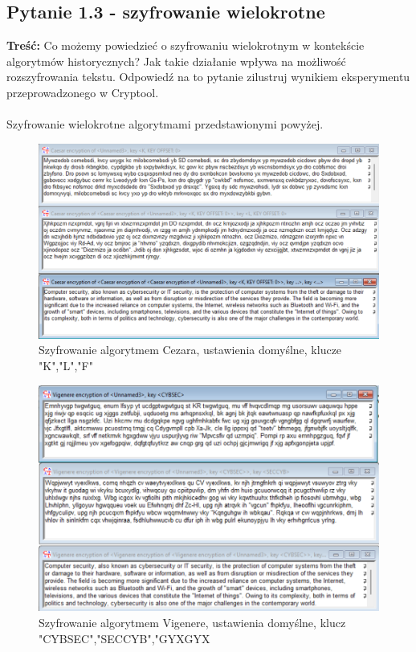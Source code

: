\documentclass{article}
\begin{document}
\subsection*{Pytanie 1.3 - szyfrowanie wielokrotne}
\textbf{Treść:}
Co możemy powiedzieć o szyfrowaniu wielokrotnym w kontekście algorytmów historycznych? Jak takie działanie wpływa na możliwość
rozszyfrowania tekstu. Odpowiedź na to pytanie zilustruj wynikiem eksperymentu przeprowadzonego w Cryptool.\\\\
Szyfrowanie wielokrotne algorytmami przedstawionymi powyżej.

\begin{figure}[H]
    \centering
    \includegraphics[width=\textwidth]{cezar_wielokrotne.png}
    \caption{Szyfrowanie algorytmem Cezara, ustawienia domyślne, klucze "K","L","F"}
\end{figure}

\begin{figure}[H]
    \centering
    \includegraphics[width=\textwidth]{vinegre_wielokrotne.png}
    \caption{Szyfrowanie algorytmem Vigenere, ustawienia domyślne, klucz "CYBSEC","SECCYB","GYXGYX}
\end{figure}
\end{document}
